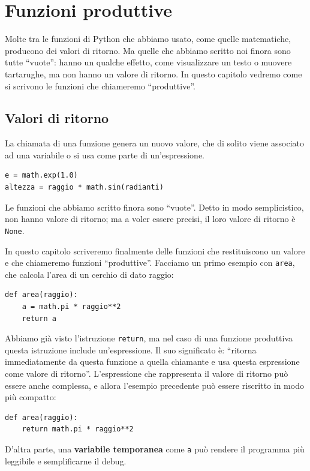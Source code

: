 \documentclass[10pt]{book}
\begin{document}
\chapter{Funzioni produttive}
\label{fruitchap}

Molte tra le funzioni di Python che abbiamo usato, come quelle matematiche, producono dei valori di ritorno. Ma quelle che abbiamo scritto noi finora sono tutte ``vuote'': hanno un qualche effetto, come visualizzare un testo o muovere tartarughe, ma non hanno un valore di ritorno. In questo capitolo vedremo come si scrivono le funzioni che chiameremo ``produttive''.

\section{Valori di ritorno}

La chiamata di una funzione genera un nuovo valore, che di solito viene associato ad una variabile o si usa come parte di un'espressione.

\begin{verbatim}
e = math.exp(1.0)
altezza = raggio * math.sin(radianti)
\end{verbatim}
%
Le funzioni che abbiamo scritto finora sono ``vuote''. Detto in modo semplicistico, non hanno valore di ritorno; ma a voler essere precisi, il loro valore di ritorno è {\tt None}.

In questo capitolo scriveremo finalmente delle funzioni che restituiscono un valore e che chiameremo funzioni ``produttive''.
Facciamo un primo esempio con {\tt area}, che calcola l'area di un cerchio di dato raggio:

\begin{verbatim}
def area(raggio):
    a = math.pi * raggio**2
    return a
\end{verbatim}
%
Abbiamo già visto l'istruzione {\tt return}, ma nel caso di una funzione    produttiva questa istruzione include un'espressione. Il suo significato è: ``ritorna immediatamente da questa funzione a quella chiamante e usa questa espressione come valore di ritorno''. L'espressione che rappresenta il valore di ritorno può essere anche complessa, e allora l'esempio precedente può essere riscritto in modo più compatto:

\begin{verbatim}
def area(raggio):
    return math.pi * raggio**2
\end{verbatim}
%
D'altra parte, una {\bf variabile temporanea} come {\tt a} può rendere il
programma più leggibile e semplificarne il debug.
\end{document}
